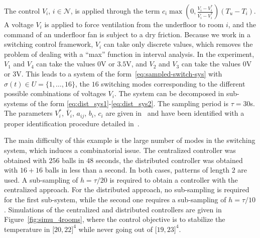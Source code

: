 The control $V_i$, $i \in \mathcal{N}$, is applied through the term
$c_i \max(0,\frac{V_i - V_i^\text{*}}{\bar{ V_i} -
  V_i^{\text{*}}})(T_u - T_i)$.  A voltage $V_i$ is applied to force
ventilation from the underfloor to room $i$, and the command of an
underfloor fan is subject to a dry friction.  Because we work in a
switching control framework, $V_i$ can take only discrete values, which
removes the problem of dealing with a ``max'' function in interval
analysis. In the experiment, $V_1$ and $V_4$ can take the values $0$V
or $3.5$V, and $V_2$ and $V_3$ can take the values $0$V or $3$V. This
leads to a system of the form~\eqref{eq:sampled-switch-sys}
with $\sigma(t) \in U =\{
1, \dots, 16 \}$, the $16$ switching modes corresponding to the
different possible combinations of voltages $V_i$. The system can be decomposed in
sub-systems of the form \eqref{eq:dist_sys1}-\eqref{eq:dist_sys2}. The sampling
period is $\tau = 30$s.
The parameters $V_i^\text{*}$, $\bar V_i$, $a_{ij}$, $b_i$,
$c_i$ are given in~\cite{meyer:tel-01232640} and have been identified
with a proper identification procedure detailed
in~\cite{meyer2014ecc}.

The main difficulty of this example is the large number of modes in
the switching system, which induces a combinatorial issue.
%
The centralized controller was obtained with $256$ balls in $48$
seconds, the distributed controller was obtained with $16 + 16$ balls
in less than a second. In both cases, patterns of length $2$ are used.
A sub-sampling of $h = \tau/20$ is required to obtain a controller
with the centralized approach. For the distributed approach,
no sub-sampling is required for the first sub-system, while the second
one requires a sub-sampling
of $h=\tau/10$.
Simulations of the centralized
and distributed controllers are given in Figure~\ref{fig:simu_4rooms}, where the control
objective is to stabilize the temperature in $\lbrack 20 , 22 \rbrack
^4$ while never going out of $\lbrack
19 , 23 \rbrack ^4$.

